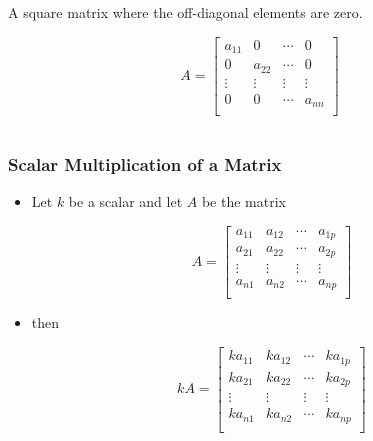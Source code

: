 \documentclass{beamer}
\begin{document}
\begin{frame}
\begin{columns}
\begin{column}{5.25cm}
\begin{itemize}
\footnotesize{A square matrix where the off-diagonal elements are zero.}

\[
A = \left[ \begin{array}{cccc}

a_{11} & 0 & \cdots & 0 \\
0 & a_{22} & \cdots & 0 \\
\vdots & \vdots & \vdots & \vdots \\
0 & 0 & \cdots & a_{nn} \\

\end{array}
\right]
\]


\end{itemize}
\end{column}

\end{columns}

\end{frame}


\begin{frame}
  \frametitle{Scalar Multiplication of a Matrix}


\begin{itemize}
	\item Let $k$ be a scalar and let $A$ be the matrix
	
\[
A = \left[ \begin{array}{cccc}

a_{11} & a_{12} & \cdots & a_{1p} \\
a_{21} & a_{22} & \cdots & a_{2p} \\
\vdots & \vdots & \vdots & \vdots \\
a_{n1} & a_{n2} & \cdots & a_{np} \\

\end{array}
\right]
\]
	

  \item then

\[
kA = \left[ \begin{array}{cccc}

ka_{11} & ka_{12} & \cdots & ka_{1p} \\
ka_{21} & ka_{22} & \cdots & ka_{2p} \\
\vdots & \vdots & \vdots & \vdots \\
ka_{n1} & ka_{n2} & \cdots & ka_{np} \\

\end{array}
\right]
\] 

\end{itemize}

\end{frame}
\end{document}
